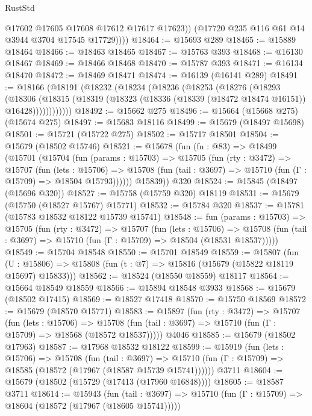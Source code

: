 \begin{lexlean}{RustStd}
\begin{coremodule}
{\begin{coremodule}
{{{{{{{{{{{{{{{{{{{{{{{{{{{{{{{{{{{{{{{{{{{{{{{              @17602
              @17605
              @17608
              @17612
              @17617
              @17623))
          (@17720 @235 @116 @61 @14 @3944 @3704 @17545 @17729))))
@18464 := @15693 @289
@18465 := @15889 @18464
@18466 := @18463 @18465
@18467 := @15763 @393
@18468 := @16130 @18467
@18469 := @18466 @18468
@18470 := @15787 @393
@18471 := @16134 @18470
@18472 := @18469 @18471
@18474 := @16139 (@16141 @289)
@18491 := @18166
    (@18191
      (@18232
        (@18234
          (@18236
            (@18253
              (@18276
                (@18293
                  (@18306
                    (@18315
                      (@18319 (@18323 (@18336 (@18339 (@18472 @18474 @16151)) @16428))))))))))))
@18492 := @15662 @275
@18496 := @15664 (@15668 @275) (@15674 @275)
@18497 := @15683 @18116
@18499 := @15679 (@18497 @15698)
@18501 := @15721 (@15722 @275)
@18502 := @15717 @18501
@18504 := @15679 (@18502 @15746)
@18521 := @15678
    (fun (fn : @83) =>
    @18499
      (@15701
        (@15704
          (fun (params : @15703) =>
          @15705
            (fun (rty : @3472) =>
            @15707
              (fun (lets : @15706) =>
              @15708 (fun (tail : @3697) => @15710 (fun (Γ : @15709) => @18504 @15793))))))
        @15839))
    @320
@18524 := @15845 (@18497 (@15696 @320))
@18527 := @15758 (@15759 @320) @18119
@18531 := @15679 (@15750 (@18527 @15767) @15771)
@18532 := @15784 @320
@18537 := @15781 (@15783 @18532 @18122 @15739 @15741)
@18548 := fun (params : @15703) =>
  @15705
    (fun (rty : @3472) =>
    @15707
      (fun (lets : @15706) =>
      @15708 (fun (tail : @3697) => @15710 (fun (Γ : @15709) => @18504 (@18531 @18537)))))
@18549 := @15704 @18548
@18550 := @15701 @18549
@18559 := @15807
    (fun (U : @15806) => @15808 (fun (t : @7) => @15816 (@15679 (@15822 @18119 @15697) @15833)))
@18562 := @18524 (@18550 @18559) @18117
@18564 := @15664 @18549 @18559
@18566 := @15894 @18548 @3933
@18568 := @15679 (@18502 @17415)
@18569 := @18527 @17418
@18570 := @15750 @18569
@18572 := @15679 (@18570 @15771)
@18583 := @15897
    (fun (rty : @3472) =>
    @15707
      (fun (lets : @15706) =>
      @15708 (fun (tail : @3697) => @15710 (fun (Γ : @15709) => @18568 (@18572 @18537)))))
    @4046
@18585 := @15679 (@18502 @17963)
@18587 := @17968 @18532 @18122
@18599 := @15919
    (fun (lets : @15706) =>
    @15708
      (fun (tail : @3697) =>
      @15710 (fun (Γ : @15709) => @18585 (@18572 (@17967 (@18587 @15739 @15741))))))
    @3711
@18604 := @15679 (@18502 (@15729 (@17413 (@17960 @16848))))
@18605 := @18587 @3711
@18614 := @15943
    (fun (tail : @3697) => @15710 (fun (Γ : @15709) => @18604 (@18572 (@17967 (@18605 @15741)))))
}}}}}}}}}}}}}}}}}}}}}}}}}}}}}}}}}}}}}}}}}}}}}}}
\end{coremodule}}
\end{coremodule}
\end{lexlean}
